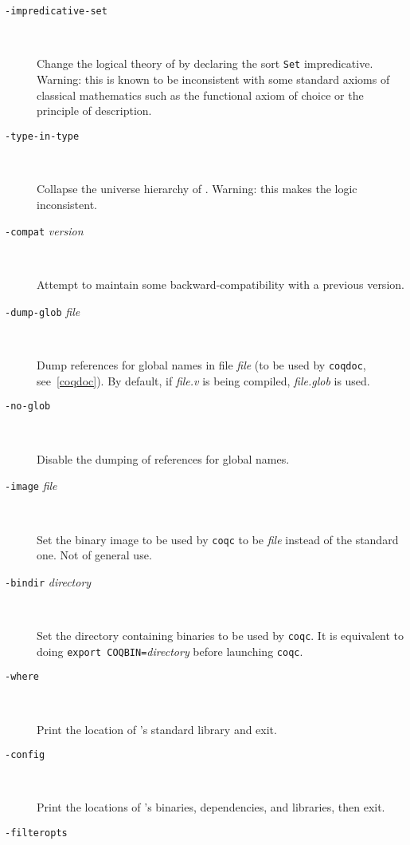 \begin{description}
\item[{\tt -impredicative-set}]\ %

  Change the logical theory of {\Coq} by declaring the sort {\tt Set}
  impredicative. Warning: this is known to be inconsistent with
  some standard axioms of classical mathematics such as the functional
  axiom of choice or the principle of description.

\item[{\tt -type-in-type}]\ %

  Collapse the universe hierarchy of {\Coq}. Warning: this makes the
  logic inconsistent.

\item[{\tt -compat} {\em version}]\ %

  Attempt to maintain some backward-compatibility with a previous version.

\item[{\tt -dump-glob} {\em file}]\ %

  Dump references for global names in file {\em file} (to be used
  by {\tt coqdoc}, see~\ref{coqdoc}). By default, if {\em file.v} is being
  compiled, {\em file.glob} is used.

\item[{\tt -no-glob}]\ %

  Disable the dumping of references for global names.


\item[{\tt -image} {\em file}]\ %

  Set the binary image to be used by {\tt coqc} to be {\em file}
  instead of the standard one. Not of general use.

\item[{\tt -bindir} {\em directory}]\ %

  Set the directory containing {\Coq} binaries to be used by {\tt coqc}.
  It is equivalent to doing \texttt{export COQBIN=}{\em directory} before
  launching {\tt coqc}.

\item[{\tt -where}]\ %

  Print the location of \Coq's standard library and exit.

\item[{\tt -config}]\ %

  Print the locations of \Coq's binaries, dependencies, and libraries, then exit.

\item[{\tt -filteropts}]\ %


\end{description}
